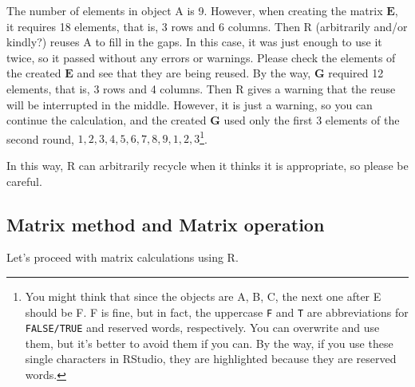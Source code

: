 \documentclass{ltjsbook}
\begin{document}
The number of elements in object A is 9. However, when creating the matrix $\bm{E}$, it requires 18 elements, that is, 3 rows and 6 columns. Then R (arbitrarily and/or kindly?) reuses A to fill in the gaps. In this case, it was just enough to use it twice, so it passed without any errors or warnings. Please check the elements of the created $\bm{E}$ and see that they are being reused. By the way, $\bm{G}$ required 12 elements, that is, 3 rows and 4 columns. Then R gives a warning that the reuse will be interrupted in the middle. However, it is just a warning, so you can continue the calculation, and the created $\bm{G}$ used only the first 3 elements of the second round, $1, 2, 3, 4, 5, 6, 7, 8, 9, 1, 2, 3$\footnote{ You might think that since the objects are A, B, C, the next one after E should be F. F is fine, but in fact, the uppercase \texttt{F} and \texttt{T} are abbreviations for \texttt{FALSE/TRUE} and reserved words, respectively. You can overwrite and use them, but it's better to avoid them if you can. By the way, if you use these single characters in RStudio, they are highlighted because they are reserved words.}.

In this way, R can arbitrarily recycle when it thinks it is appropriate, so please be careful.
\subsection{Matrix method and Matrix operation}
Let's proceed with matrix calculations using R.
\end{document}
